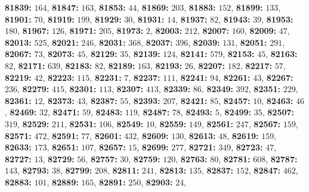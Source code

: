 \textsf{\bfseries 81839:} $164$, \textsf{\bfseries 81847:} $163$, \textsf{\bfseries 81853:} $44$, \textsf{\bfseries 81869:} $203$, \textsf{\bfseries 81883:} $152$, \textsf{\bfseries 81899:} $133$, \textsf{\bfseries 81901:} $70$, \textsf{\bfseries 81919:} $199$, \textsf{\bfseries 81929:} $30$, \textsf{\bfseries 81931:} $14$, \textsf{\bfseries 81937:} $82$, \textsf{\bfseries 81943:} $39$, \textsf{\bfseries 81953:} $180$, \textsf{\bfseries 81967:} $126$, \textsf{\bfseries 81971:} $205$, \textsf{\bfseries 81973:} $2$, \textsf{\bfseries 82003:} $212$, \textsf{\bfseries 82007:} $160$, \textsf{\bfseries 82009:} $47$, \textsf{\bfseries 82013:} $525$, \textsf{\bfseries 82021:} $246$, \textsf{\bfseries 82031:} $368$, \textsf{\bfseries 82037:} $396$, \textsf{\bfseries 82039:} $131$, \textsf{\bfseries 82051:} $291$, \textsf{\bfseries 82067:} $73$, \textsf{\bfseries 82073:} $45$, \textsf{\bfseries 82129:} $35$, \textsf{\bfseries 82139:} $124$, \textsf{\bfseries 82141:} $579$, \textsf{\bfseries 82153:} $45$, \textsf{\bfseries 82163:} $82$, \textsf{\bfseries 82171:} $639$, \textsf{\bfseries 82183:} $82$, \textsf{\bfseries 82189:} $163$, \textsf{\bfseries 82193:} $26$, \textsf{\bfseries 82207:} $182$, \textsf{\bfseries 82217:} $57$, \textsf{\bfseries 82219:} $42$, \textsf{\bfseries 82223:} $115$, \textsf{\bfseries 82231:} $7$, \textsf{\bfseries 82237:} $111$, \textsf{\bfseries 82241:} $94$, \textsf{\bfseries 82261:} $43$, \textsf{\bfseries 82267:} $236$, \textsf{\bfseries 82279:} $415$, \textsf{\bfseries 82301:} $113$, \textsf{\bfseries 82307:} $413$, \textsf{\bfseries 82339:} $86$, \textsf{\bfseries 82349:} $392$, \textsf{\bfseries 82351:} $229$, \textsf{\bfseries 82361:} $12$, \textsf{\bfseries 82373:} $43$, \textsf{\bfseries 82387:} $55$, \textsf{\bfseries 82393:} $207$, \textsf{\bfseries 82421:} $85$, \textsf{\bfseries 82457:} $10$, \textsf{\bfseries 82463:} $46$, \textsf{\bfseries 82469:} $32$, \textsf{\bfseries 82471:} $59$, \textsf{\bfseries 82483:} $119$, \textsf{\bfseries 82487:} $78$, \textsf{\bfseries 82493:} $5$, \textsf{\bfseries 82499:} $35$, \textsf{\bfseries 82507:} $319$, \textsf{\bfseries 82529:} $211$, \textsf{\bfseries 82531:} $106$, \textsf{\bfseries 82549:} $10$, \textsf{\bfseries 82559:} $149$, \textsf{\bfseries 82561:} $247$, \textsf{\bfseries 82567:} $159$, \textsf{\bfseries 82571:} $472$, \textsf{\bfseries 82591:} $77$, \textsf{\bfseries 82601:} $432$, \textsf{\bfseries 82609:} $130$, \textsf{\bfseries 82613:} $48$, \textsf{\bfseries 82619:} $159$, \textsf{\bfseries 82633:} $173$, \textsf{\bfseries 82651:} $107$, \textsf{\bfseries 82657:} $15$, \textsf{\bfseries 82699:} $277$, \textsf{\bfseries 82721:} $349$, \textsf{\bfseries 82723:} $47$, \textsf{\bfseries 82727:} $13$, \textsf{\bfseries 82729:} $56$, \textsf{\bfseries 82757:} $30$, \textsf{\bfseries 82759:} $120$, \textsf{\bfseries 82763:} $80$, \textsf{\bfseries 82781:} $608$, \textsf{\bfseries 82787:} $143$, \textsf{\bfseries 82793:} $38$, \textsf{\bfseries 82799:} $208$, \textsf{\bfseries 82811:} $241$, \textsf{\bfseries 82813:} $135$, \textsf{\bfseries 82837:} $152$, \textsf{\bfseries 82847:} $462$, \textsf{\bfseries 82883:} $101$, \textsf{\bfseries 82889:} $165$, \textsf{\bfseries 82891:} $250$, \textsf{\bfseries 82903:} $24$, 
